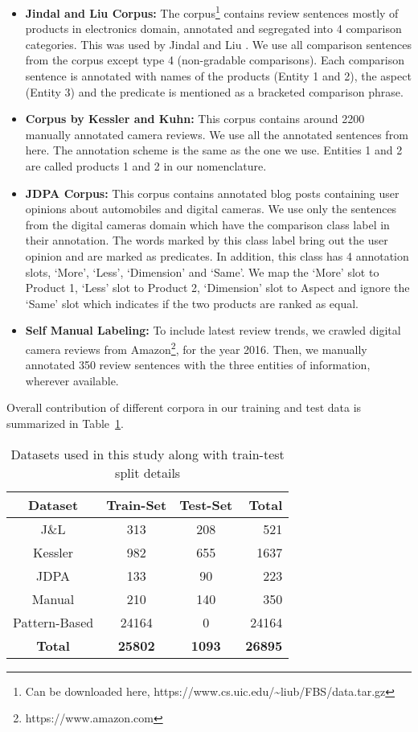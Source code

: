 \begin{itemize}[leftmargin=*]
\item \textbf{Jindal and Liu Corpus:} The corpus\footnote{Can be downloaded here, https://www.cs.uic.edu/\textasciitilde liub/FBS/data.tar.gz} contains review sentences mostly of products in electronics domain, annotated and segregated into 4 comparison categories. This was used by Jindal and Liu \cite{jindal2006mining, jindal2006identifying}. We use all comparison sentences from the corpus except type 4 (non-gradable comparisons). Each comparison sentence is annotated with names of the products (Entity 1 and 2), the aspect (Entity 3) and the predicate is mentioned as a bracketed comparison phrase.
\item \textbf{Corpus by Kessler and Kuhn:} This corpus \cite{kessler2014corpus} contains around 2200 manually annotated camera reviews. We use all the annotated sentences from here. The annotation scheme is the same as the one we use. Entities 1 and 2 are called products 1 and 2 in our nomenclature.
\item \textbf{JDPA Corpus:} This corpus \cite{KesslerEtAl2010} contains annotated blog posts containing user opinions about automobiles and digital cameras. We use only the sentences from the digital cameras domain which have the comparison class label in their annotation. The words marked by this class label bring out the user opinion and are marked as predicates. In addition, this class has 4 annotation slots, `More', `Less', `Dimension' and `Same'. We map the `More' slot to Product 1, `Less' slot to Product 2, `Dimension' slot to Aspect and ignore the `Same' slot which indicates if the two products are ranked as equal.
\item \textbf{Self Manual Labeling:} To include latest review trends, we crawled digital camera reviews from Amazon\footnote{https://www.amazon.com}, for the year 2016. Then, we manually annotated 350 review sentences with the three entities of information, wherever available.
\end{itemize}

Overall contribution of different corpora in our training and test data is summarized in Table~\ref{datasettable}.
\begin{table}[ht]
	\centering
\begin{tabular}{ | c || c | c | r | }
	\hline			
	Dataset & Train-Set & Test-Set & Total\\ \hline
	J\&L & 313 & 208 & 521\\ \hline
	Kessler & 982 & 655 & 1637\\ \hline
	JDPA & 133 & 90 & 223\\ \hline
    Manual & 210 & 140 & 350\\ \hline
    Pattern-Based & 24164 & 0 & 24164\\ \hline
    \textbf{Total} & \textbf{25802} & \textbf{1093} & \textbf{26895}\\ \hline
\end{tabular}
\caption{Datasets used in this study along with train-test split details}
\label{datasettable}
\vspace{-3em}
\end{table}

